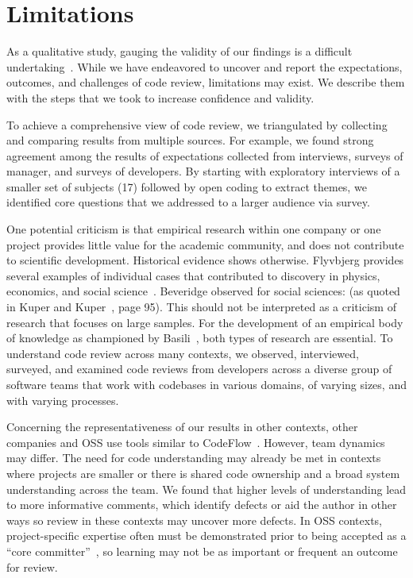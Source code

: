 
\section{Limitations} \label{sec:limitations}


As a qualitative study, gauging the validity of our findings is a difficult undertaking~\cite{golafshani2003understanding}. While we have endeavored to uncover and report the expectations, outcomes, and challenges of code review, limitations may exist. We describe them with the steps that we took to increase confidence and validity.

To achieve a comprehensive view of code review, we triangulated by collecting and comparing results from multiple sources. For example, we found strong agreement among the results of expectations collected from interviews, surveys of manager, and surveys of developers. By starting with exploratory interviews of a smaller set of subjects (17) followed by open coding to extract themes, we identified core questions that we addressed to a larger audience via survey.

One potential criticism is that empirical research within one company or one project provides little value for the academic community, and does not contribute to scientific development. Historical evidence shows otherwise. Flyvbjerg provides several examples of individual cases that contributed to discovery in physics, economics, and social science~\cite{flyvbjerg2006five}. Beveridge observed for social sciences:  (as quoted in Kuper and Kuper~\cite{kuper1995social}, page 95). This should not be interpreted as a criticism of research that focuses on large samples. For the development of an empirical body of knowledge as championed by Basili~\cite{basili1999building}, both types of research are essential. To understand code review across many contexts, we observed, interviewed, surveyed, and examined code reviews from developers across a diverse group of software teams that work with codebases in various domains, of varying sizes, and with varying processes.

Concerning the representativeness of our results in other contexts, other companies and OSS use tools similar to CodeFlow~\cite{gerrit2012online, tsotsis2011online, kennedy2006online}. However, team dynamics may differ. The need for code understanding may already be met in contexts where projects are smaller or there is shared code ownership and a broad system understanding across the team. We found that higher levels of understanding lead to more informative comments, which identify defects or aid the author in other ways so review in these contexts may uncover more defects. In OSS contexts, project-specific expertise often must be demonstrated prior to being accepted as a ``core committer''~\cite{bird2007open}, so learning may not be as important or frequent an outcome for review.

